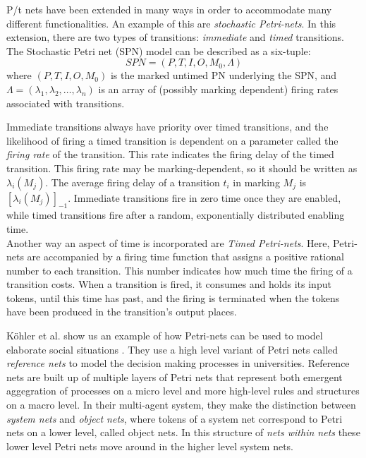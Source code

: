 \documentclass[11pt, a4paper]{book}
\begin{document}
P/t nets have been extended in many ways in order to accommodate many different functionalities. An example of this are \emph{stochastic Petri-nets}. In this extension, there are two types of transitions: \emph{immediate} and \emph{timed} transitions.
The Stochastic Petri net (SPN) model can be described as a six-tuple:
\begin{equation}
SPN = (P,T,I,O,M_0,\Lambda)
\end{equation}
where $(P,T,I,O,M_0)$ is the marked untimed PN underlying the SPN, and $\Lambda = (\lambda_1, \lambda_2, \ldots, \lambda_n)$ is an array of (possibly marking dependent) firing rates associated with transitions.

Immediate transitions always have priority over timed transitions, and  the likelihood of firing a timed transition is dependent on a parameter called the \emph{firing rate} of the transition. This rate indicates the firing delay of the timed transition. This firing rate may be marking-dependent, so it should be written as $\lambda_i(M_j)$.  The average firing delay of a transition $t_i$ in marking $M_j$ is $[\lambda_i(M_j)]_{-1}$. Immediate transitions fire in zero time once they are enabled, while timed transitions fire after a random, exponentially distributed enabling time.\\
Another way an aspect of time is incorporated are \emph{Timed Petri-nets}\cite{zuberek1980timed}. Here, Petri-nets are accompanied by a firing time function that assigns a positive rational number to each transition. This number indicates how much time the firing of a transition costs. When a transition is fired, it consumes and holds its input tokens, until this time has past, and the firing is terminated when the tokens have been produced in the transition's output places.

K\"{o}hler et al. show us an example of how Petri-nets can be used to model elaborate social situations \cite{Köhler03modellingsocial}. They use a high level variant of Petri nets called \emph{reference nets} to model the decision making processes in universities. Reference nets are built up of multiple layers of Petri nets that represent both emergent aggegration of processes on a micro level and more high-level rules and structures on a macro level. In their multi-agent system, they make the distinction between \emph{system nets} and \emph{object nets}, where tokens of a system net correspond to Petri nets on a lower level, called object nets. In this structure of \emph{nets within nets} these lower level Petri nets move around in the higher level system nets. 
\end{document}
